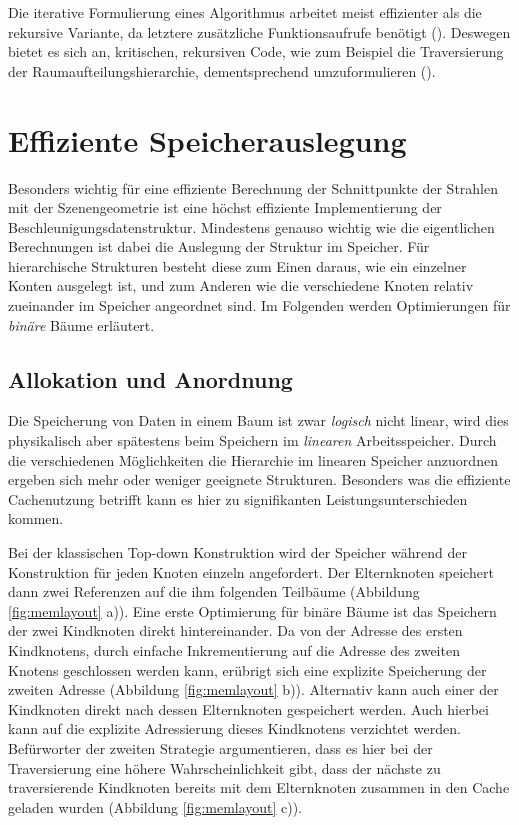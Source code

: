 Die iterative Formulierung eines Algorithmus arbeitet meist effizienter als die rekursive Variante, da letztere zusätzliche Funktionsaufrufe benötigt (\cite{Lantzman07}).
Deswegen bietet es sich an, kritischen, rekursiven Code, wie zum Beispiel die Traversierung der Raumaufteilungshierarchie, dementsprechend umzuformulieren (\cite{Wald04}).

\section{Effiziente Speicherauslegung}
\label{sec:layout}
Besonders wichtig für eine effiziente Berechnung der Schnittpunkte der Strahlen mit der Szenengeometrie ist eine höchst effiziente Implementierung der Beschleunigungsdatenstruktur. Mindestens genauso wichtig wie die eigentlichen Berechnungen ist dabei die Auslegung der Struktur im Speicher. Für hierarchische Strukturen besteht diese zum Einen daraus, wie ein einzelner Konten ausgelegt ist, und zum Anderen wie die verschiedene Knoten relativ zueinander im Speicher angeordnet sind. Im Folgenden werden Optimierungen für \textit{binäre} Bäume erläutert.

\subsection{Allokation und Anordnung}

Die Speicherung von Daten in einem Baum ist zwar \textit{logisch} nicht linear, wird dies physikalisch aber spätestens beim Speichern im \textit{linearen} Arbeitsspeicher.
Durch die verschiedenen Möglichkeiten die Hierarchie im linearen Speicher anzuordnen ergeben sich mehr oder weniger geeignete Strukturen. Besonders was die effiziente Cachenutzung betrifft kann es hier zu signifikanten Leistungsunterschieden kommen.

Bei der klassischen Top-down Konstruktion wird der Speicher während der Konstruktion für jeden Knoten einzeln angefordert. Der Elternknoten speichert dann zwei Referenzen auf die ihm folgenden Teilbäume (Abbildung \ref{fig:memlayout} a)).
Eine erste Optimierung für binäre Bäume ist das Speichern der zwei Kindknoten direkt hintereinander. Da von der Adresse des ersten Kindknotens, durch einfache Inkrementierung auf die Adresse des zweiten Knotens geschlossen werden kann, erübrigt sich eine explizite Speicherung der zweiten Adresse (Abbildung \ref{fig:memlayout} b)).
Alternativ kann auch einer der Kindknoten direkt nach dessen Elternknoten gespeichert werden. Auch hierbei kann auf die explizite Adressierung dieses Kindknotens verzichtet werden. Befürworter der zweiten Strategie argumentieren, dass es hier bei der Traversierung eine höhere Wahrscheinlichkeit gibt, dass der nächste zu traversierende Kindknoten bereits mit dem Elternknoten zusammen in den Cache geladen wurden (Abbildung \ref{fig:memlayout} c)).

